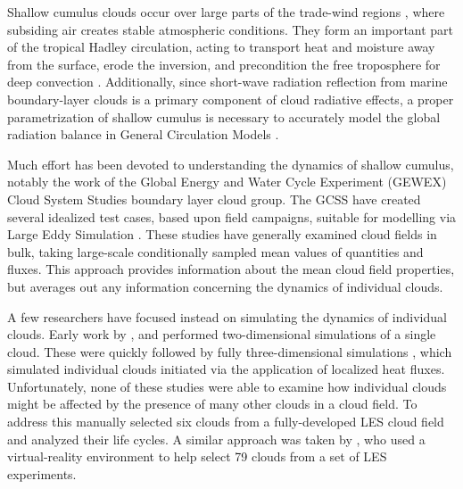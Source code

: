 \documentclass[acp]{copernicus}
\begin{document}

\introduction

Shallow cumulus clouds occur over large parts of the trade-wind regions 
\citep{Norris1988}, where subsiding air creates stable atmospheric conditions.  
They form an important part of the tropical Hadley circulation, acting to 
transport heat and moisture away from the surface, erode the inversion, and 
precondition the free troposphere for deep convection \citep{Tiedtke1988, 
Neggers2007}.  Additionally, since short-wave radiation reflection from marine 
boundary-layer clouds is a primary component of cloud radiative effects, a
proper parametrization of shallow cumulus is necessary to accurately model 
the global radiation balance in General Circulation Models 
\citep[GCMs;][]{Bony2005, Medeiros2008, Wyant2009, Medeiros2011}.

Much effort has been devoted to understanding the dynamics of shallow cumulus, 
notably the work of the Global Energy and Water Cycle Experiment (GEWEX) Cloud 
System Studies \citep[GCSS;][]{Randall2003} boundary layer cloud group.  The 
GCSS have created several idealized test cases, based upon field campaigns, 
suitable for modelling via Large Eddy Simulation \citep[LES;][]{Siebesma1995, 
Stevens2001, Brown2002, vanZanten2011}.  These studies have 
generally examined cloud fields in bulk, taking large-scale conditionally 
sampled mean values of quantities and fluxes.  This approach provides 
information about the mean cloud field properties, but averages out any 
information concerning the dynamics of individual clouds.

A few researchers have focused instead on simulating the dynamics of individual
clouds. Early work by \cite{Klaassen1985}, \cite{Bretherton1989} and 
\cite{Grabowski1991} performed two-dimensional simulations of a single 
cloud.  These were quickly followed by fully three-dimensional simulations 
\citep{Grabowski1993, Grabowski1993a, Carpenter1998, Blyth2005}, which 
simulated individual clouds initiated via the application of localized heat 
fluxes.  Unfortunately, none of these studies were able to examine how 
individual clouds might be affected by the presence of many other clouds in a 
cloud field.  To address this \cite{Zhao2005, Zhao2005a} manually selected six 
clouds from a fully-developed LES cloud field and analyzed their life cycles.  
A similar approach was taken by \cite{Heus2009}, who used a virtual-reality 
environment to help select 79 clouds from a set of LES experiments.
\end{document}
